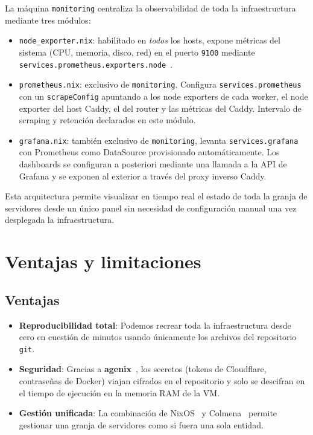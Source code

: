 \documentclass[a4paper, 11pt]{article}
\begin{document}
La máquina \texttt{monitoring} centraliza la observabilidad de toda la infraestructura mediante tres módulos:

\begin{itemize}
  \item \texttt{node\_exporter.nix}: habilitado en \textit{todos} los hosts, expone métricas del sistema (CPU, memoria, disco, red)
    en el puerto \texttt{9100} mediante \texttt{services.prometheus.exporters.node}~\cite{prometheus}.
  \item \texttt{prometheus.nix}: exclusivo de \texttt{monitoring}. Configura
    \texttt{services.prometheus}~\cite{prometheus} con un \texttt{scrapeConfig} apuntando
    a los node exporters de cada worker, el node exporter del host Caddy, el del router y las métricas del Caddy. Intervalo de scraping y retención declarados en este módulo.
  \item \texttt{grafana.nix}: también exclusivo de \texttt{monitoring}, levanta \texttt{services.grafana}~\cite{grafana} con Prometheus como DataSource provisionado automáticamente.
    Los dashboards se configuran a posteriori mediante una llamada a la API de Grafana y se exponen al exterior a través del proxy inverso Caddy.
\end{itemize}

Esta arquitectura permite visualizar en tiempo real el estado de toda la granja de servidores
desde un único panel sin necesidad de configuración manual una vez desplegada la infraestructura.

\section{Ventajas y limitaciones}

\subsection{Ventajas}
\begin{itemize}
    \item \textbf{Reproducibilidad total}: Podemos recrear toda la infraestructura desde cero en cuestión de minutos usando únicamente los archivos del repositorio \texttt{git}.
    \item \textbf{Seguridad}: Gracias a \textbf{agenix}~\cite{agenix}, los secretos (tokens de Cloudflare, contraseñas de Docker) viajan cifrados
      en el repositorio y solo se descifran en el tiempo de ejecución en la memoria RAM de la VM.
    \item \textbf{Gestión unificada}: La combinación de NixOS~\cite{nixos} y Colmena~\cite{colmena} permite gestionar una granja de servidores como si fuera una sola entidad.
\end{itemize}
\end{document}
